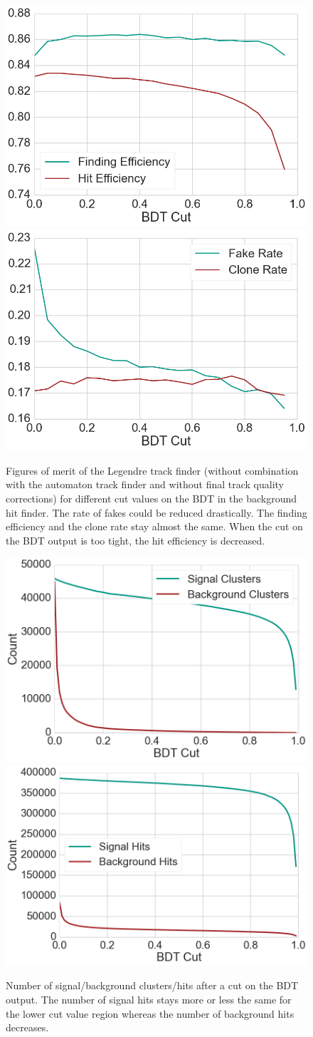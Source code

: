 \begin{figure}
  \centering
  \includegraphics[width=0.48\linewidth]{figures/workflow/background_hit_finder_efficiency.png}
  \includegraphics[width=0.48\linewidth]{figures/workflow/background_hit_finder_rate.png}
  \caption{Figures of merit of the Legendre track finder (without combination with the automaton track finder and without final track quality corrections) for different cut values on the BDT in the background hit finder. The rate of fakes could be reduced drastically. The finding efficiency and the clone rate stay almost the same. When the cut on the BDT output is too tight, the hit efficiency is decreased.}
  \label{fig-result-background-hit-finder2}
\end{figure}

\begin{figure}
  \centering
  \includegraphics[width=0.48\linewidth]{figures/workflow/number_of_clusters.png}
  \includegraphics[width=0.48\linewidth]{figures/workflow/number_of_hits.png}
  \caption{Number of signal/background clusters/hits after a cut on the BDT output. The number of signal hits stays more or less the same for the lower cut value region whereas the number of background hits decreases.}
  \label{fig-hits-numbers}
\end{figure}


